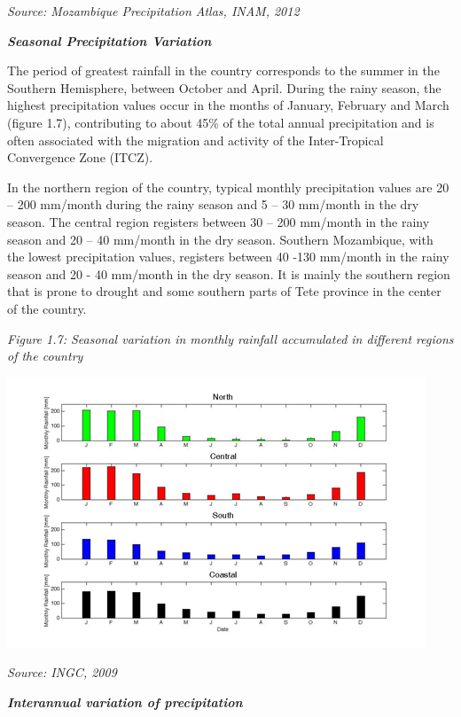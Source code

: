 \documentclass[
]{book}
\begin{document}
\emph{Source: Mozambique Precipitation Atlas, INAM, 2012}

\textbf{\emph{Seasonal Precipitation Variation}}

The period of greatest rainfall in the country corresponds to the summer in the Southern Hemisphere, between October and April. During the rainy season, the highest precipitation values occur in the months of January, February and March (figure 1.7), contributing to about 45\% of the total annual precipitation and is often associated with the migration and activity of the Inter-Tropical Convergence Zone (ITCZ).

In the northern region of the country, typical monthly precipitation values are 20 -- 200 mm/month during the rainy season and 5 -- 30 mm/month in the dry season. The central region registers between 30 -- 200 mm/month in the rainy season and 20 -- 40 mm/month in the dry season. Southern Mozambique, with the lowest precipitation values, registers between 40 -130 mm/month in the rainy season and 20 - 40 mm/month in the dry season. It is mainly the southern region that is prone to drought and some southern parts of Tete province in the center of the country.

\emph{Figure 1.7: Seasonal variation in monthly rainfall accumulated in different regions of the country}

\includegraphics{Rainfall-variation.png}

\emph{Source: INGC, 2009}

\textbf{\emph{Interannual variation of precipitation}}
\end{document}

